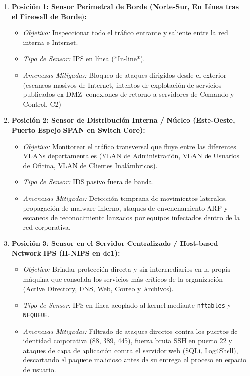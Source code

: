\begin{enumerate}
  \item \textbf{Posición 1: Sensor Perimetral de Borde (Norte-Sur, En Línea tras el Firewall de Borde):}
    \begin{itemize}
      \item \textit{Objetivo:} Inspeccionar todo el tráfico entrante y saliente entre la red interna e Internet.
      \item \textit{Tipo de Sensor:} IPS en línea (*In-line*).
      \item \textit{Amenazas Mitigadas:} Bloqueo de ataques dirigidos desde el exterior (escaneos masivos de Internet, intentos de explotación de servicios publicados en DMZ, conexiones de retorno a servidores de Comando y Control, C2).
    \end{itemize}
  \item \textbf{Posición 2: Sensor de Distribución Interna / Núcleo (Este-Oeste, Puerto Espejo SPAN en Switch Core):}
    \begin{itemize}
      \item \textit{Objetivo:} Monitorear el tráfico transversal que fluye entre las diferentes VLANs departamentales (VLAN de Administración, VLAN de Usuarios de Oficina, VLAN de Clientes Inalámbricos).
      \item \textit{Tipo de Sensor:} IDS pasivo fuera de banda.
      \item \textit{Amenazas Mitigadas:} Detección temprana de movimientos laterales, propagación de malware interno, ataques de envenenamiento ARP y escaneos de reconocimiento lanzados por equipos infectados dentro de la red corporativa.
    \end{itemize}
  \item \textbf{Posición 3: Sensor en el Servidor Centralizado / Host-based Network IPS (H-NIPS en dc1):}
    \begin{itemize}
      \item \textit{Objetivo:} Brindar protección directa y sin intermediarios en la propia máquina que consolida los servicios más críticos de la organización (Active Directory, DNS, Web, Correo y Archivos).
      \item \textit{Tipo de Sensor:} IPS en línea acoplado al kernel mediante \texttt{nftables} y \texttt{NFQUEUE}.
      \item \textit{Amenazas Mitigadas:} Filtrado de ataques directos contra los puertos de identidad corporativa (88, 389, 445), fuerza bruta SSH en puerto 22 y ataques de capa de aplicación contra el servidor web (SQLi, Log4Shell), descartando el paquete malicioso antes de su entrega al proceso en espacio de usuario.
    \end{itemize}
\end{enumerate}

